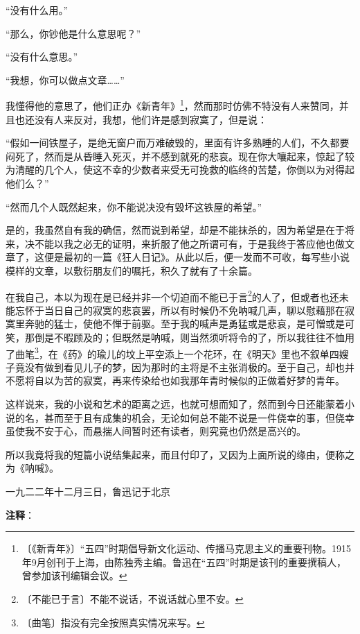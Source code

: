 \documentclass[12pt,UTF-8,openany]{ctexbook}
\begin{document}
\begin{large}
    “没有什么用。”
    
    “那么，你钞他是什么意思呢？”
    
    “没有什么意思。”
    
    “我想，你可以做点文章……”
    
    我懂得他的意思了，他们正办《新青年》\footnote{〔《新青年》〕“五四”时期倡导新文化运动、传播马克思主义的重要刊物。1915年9月创刊于上海，由陈独秀主编。鲁迅在“五四”时期是该刊的重要撰稿人，曾参加该刊编辑会议。}，然而那时仿佛不特没有人来赞同，并且也还没有人来反对，我想，他们许是感到寂寞了，但是说：
    
    “假如一间铁屋子，是绝无窗户而万难破毁的，里面有许多熟睡的人们，不久都要闷死了，然而是从昏睡入死灭，并不感到就死的悲哀。现在你大嚷起来，惊起了较为清醒的几个人，使这不幸的少数者来受无可挽救的临终的苦楚，你倒以为对得起他们么？”
    
    “然而几个人既然起来，你不能说决没有毁坏这铁屋的希望。”
    
    是的，我虽然自有我的确信，然而说到希望，却是不能抹杀的，因为希望是在于将来，决不能以我之必无的证明，来折服了他之所谓可有，于是我终于答应他也做文章了，这便是最初的一篇《狂人日记》。从此以后，便一发而不可收，每写些小说模样的文章，以敷衍朋友们的嘱托，积久了就有了十余篇。
    
    在我自己，本以为现在是已经并非一个切迫而不能已于言\footnote{〔不能已于言〕不能不说话，不说话就心里不安。}的人了，但或者也还未能忘怀于当日自己的寂寞的悲哀罢，所以有时候仍不免呐喊几声，聊以慰藉那在寂寞里奔驰的猛士，使他不惮于前驱。至于我的喊声是勇猛或是悲哀，是可憎或是可笑，那倒是不暇顾及的；但既然是呐喊，则当然须听将令的了，所以我往往不恤用了曲笔\footnote{〔曲笔〕指没有完全按照真实情况来写。}，在《药》的瑜儿的坟上平空添上一个花环，在《明天》里也不叙单四嫂子竟没有做到看见儿子的梦，因为那时的主将是不主张消极的。至于自己，却也并不愿将自以为苦的寂寞，再来传染给也如我那年青时候似的正做着好梦的青年。
    
    这样说来，我的小说和艺术的距离之远，也就可想而知了，然而到今日还能蒙着小说的名，甚而至于且有成集的机会，无论如何总不能不说是一件侥幸的事，但侥幸虽使我不安于心，而悬揣人间暂时还有读者，则究竟也仍然是高兴的。
    
    所以我竟将我的短篇小说结集起来，而且付印了，又因为上面所说的缘由，便称之为《呐喊》。
    
    \hfill 一九二二年十二月三日，鲁迅记于北京
    
\end{large}


\newpage

\textbf{注释}：
\end{document}
